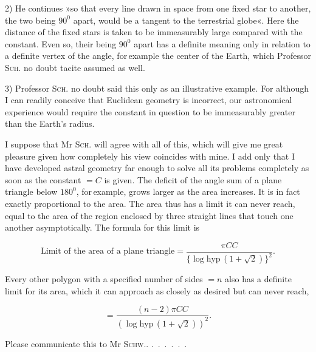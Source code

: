 2) He continues »so that every line drawn in space from one fixed star to another, the two being $90^{0}$ apart, would be a tangent to the terrestrial globe«. Here the distance of the fixed stars is taken to be immeasurably large compared with the constant. Even so, their being $90^{0}$ apart has a definite meaning only in relation to a definite vertex of the angle, for\,example the center of the Earth, which Professor \textsc{Sch.} no doubt tacite assumed as well.

3) Professor \textsc{Sch.} no doubt said this only as an illustrative example. For although I can readily conceive that Euclidean geometry is incorrect, our astronomical experience would require the constant in question to be immeasurably greater than the Earth's radius.

I suppose that Mr \textsc{Sch.} will agree with all of this, which will give me great pleasure given how completely his view coincides with mine. I add only that I have developed astral geometry far enough to solve all its problems completely as soon as the constant $= C$ is given. The deficit of the angle sum of a plane triangle below $180^{0}$, for\,example, grows larger as the area increases. It is in fact exactly proportional to the area. The area thus has a limit it can never reach, equal to the area of the region enclosed by three straight lines that touch one another asymptotically. The formula for this limit is
\begin{center}\end{center}
\[
\text{Limit of the area of a plane triangle} = \frac{\pi CC}{\{\log\mathrm{hyp}\,(1+\sqrt{2})\}^{2}}.
\]



Every other polygon with a specified number of sides $= n$ also has a definite limit for its area, which it can approach as closely as desired but can never reach,

\[
= \frac{(n-2)\pi CC}{(\log\mathrm{hyp}\,(1+\sqrt{2}))^{2}}.
\]

Please communicate this to Mr \textsc{Schw.}. .\ .\ .\ .\ .\ .

\bigskip
\noindent\hrulefill

